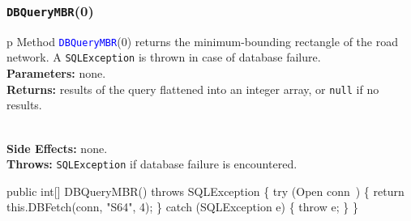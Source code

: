 \documentclass{article}
\def\nwendcode{\endtrivlist \endgroup}      %
\let\nwdocspar=\par
\theoremstyle{definition}                   %
\begin{document}
\subsubsection{{\tt{}\protect{}DBQueryMBR}(0)}
\begin{tabular}{p{\textwidth}}
\toprule
{}
Method \textcolor{blue}{{\tt{}\protect{}DBQueryMBR}}(0) returns the minimum-bounding
rectangle of the road network.
A {\tt{}SQLException} is thrown in case of database failure.\\
\midrule
\textbf{Parameters:} none.\\
\textbf{Returns:} results of the query flattened into an integer array, or
{\tt{}null} if no results.

\\
\textbf{Side Effects:} none.\\
\textbf{Throws:} {\tt{}SQLException} if database failure is encountered.\\
\bottomrule
\end{tabular}
\nwenddocs{}\endmoddef{}
public int[] DBQueryMBR() throws SQLException \{
  try (\LA{}Open \code{}conn\edoc{}~{\nwtagstyle{}}\RA{}) \{
    return this.DBFetch(conn, "S64", 4);
  \} catch (SQLException e) \{
    throw e;
  \}
\}
\eatline
{}\nwendcode{}\nwdocspar
\end{document}
